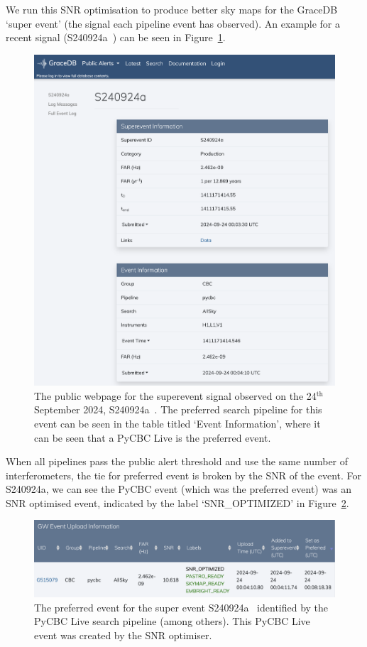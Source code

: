 We run this SNR optimisation to produce better sky maps for the GraceDB `super event' (the \gwadj signal each pipeline event has observed). An example for a recent \gwadj signal (S240924a~\cite{superevent_S240924a}) can be seen in Figure~\ref{7:fig:gracedb_pref_event}.
%
\begin{figure}
    \centering
    \includegraphics[width=1.0\linewidth]{images/7_snr_optimiser/gracedb_public_snr_optimiser.png}
    \caption{The public webpage for the superevent \gwadj signal observed on the 24$^{\text{th}}$ September 2024, S240924a~\cite{superevent_S240924a}. The preferred search pipeline for this event can be seen in the table titled `Event Information', where it can be seen that a PyCBC Live is the preferred event.}
    \label{7:fig:gracedb_pref_event}
\end{figure}
%
When all pipelines pass the public alert threshold and use the same number of interferometers, the tie for preferred event is broken by the SNR of the event. For S240924a, we can see the PyCBC event (which was the preferred event) was an SNR optimised event, indicated by the label `SNR\_OPTIMIZED' in Figure~\ref{7:fig:gracedb_snr_optimizer}.
%
\begin{figure}
    \centering
    \includegraphics[width=1.0\linewidth]{images/7_snr_optimiser/gracedb_pycbc_pref_event.png}
    \caption{The preferred event for the super event S240924a~\cite{superevent_S240924a} identified by the PyCBC Live search pipeline (among others). This PyCBC Live event was created by the SNR optimiser.}
    \label{7:fig:gracedb_snr_optimizer}
\end{figure}
%


